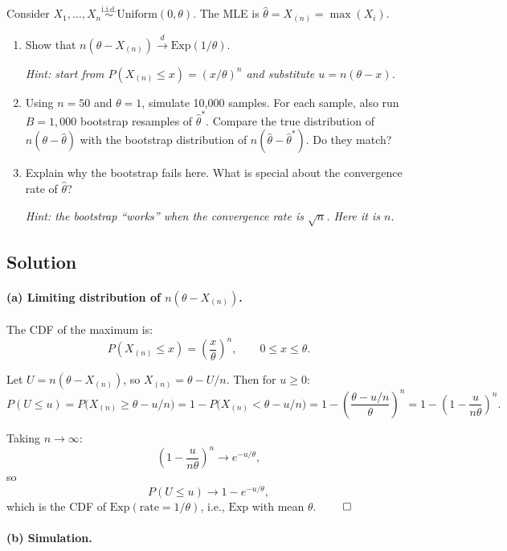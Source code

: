 \documentclass[11pt]{article}
\begin{document}
Consider $X_1, \ldots, X_n \overset{\text{i.i.d.}}{\sim} \text{Uniform}(0, \theta)$. The MLE is $\hat{\theta} = X_{(n)} = \max(X_i)$.

\begin{enumerate}[label=\alph*)]
  \item Show that $n(\theta - X_{(n)}) \xrightarrow{d} \text{Exp}(1/\theta)$.

  \emph{Hint: start from $P(X_{(n)} \leq x) = (x/\theta)^n$ and substitute $u = n(\theta - x)$.}
  \item Using $n = 50$ and $\theta = 1$, simulate 10,000 samples. For each sample, also run $B = 1{,}000$ bootstrap resamples of $\hat{\theta}^*$. Compare the true distribution of $n(\theta - \hat{\theta})$ with the bootstrap distribution of $n(\hat{\theta} - \hat{\theta}^*)$. Do they match?
  \item Explain why the bootstrap fails here. What is special about the convergence rate of $\hat{\theta}$?

  \emph{Hint: the bootstrap ``works'' when the convergence rate is $\sqrt{n}$. Here it is $n$.}
\end{enumerate}

\subsection*{Solution}

\paragraph{(a) Limiting distribution of $n(\theta - X_{(n)})$.}

The CDF of the maximum is:
\[
  P(X_{(n)} \leq x) = \left(\frac{x}{\theta}\right)^n, \qquad 0 \leq x \leq \theta.
\]

Let $U = n(\theta - X_{(n)})$, so $X_{(n)} = \theta - U/n$. Then for $u \geq 0$:
\[
  P(U \leq u) = P\!\bigl(X_{(n)} \geq \theta - u/n\bigr)
  = 1 - P\!\bigl(X_{(n)} < \theta - u/n\bigr)
  = 1 - \left(\frac{\theta - u/n}{\theta}\right)^n
  = 1 - \left(1 - \frac{u}{n\theta}\right)^n.
\]

Taking $n \to \infty$:
\[
  \left(1 - \frac{u}{n\theta}\right)^n \to e^{-u/\theta},
\]
so
\[
  P(U \leq u) \to 1 - e^{-u/\theta},
\]
which is the CDF of $\text{Exp}(\text{rate} = 1/\theta)$, i.e., $\text{Exp}$ with mean $\theta$. $\qed$

\paragraph{(b) Simulation.}
\end{document}
